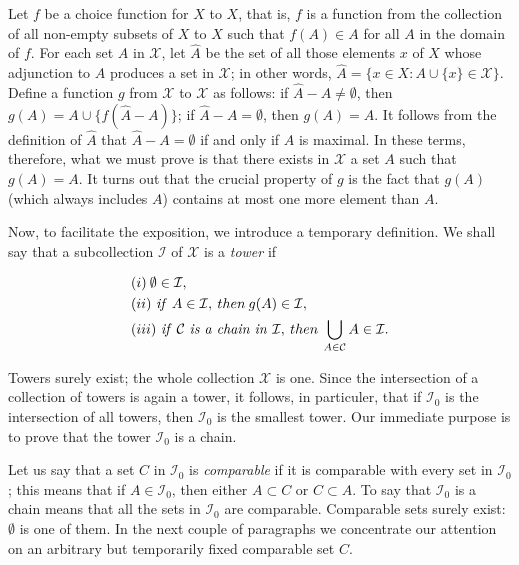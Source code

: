 Let $f$ be a choice function for $X$ to $X$, that is, $f$ is a function from the collection of all non-empty subsets of $X$ to $X$ such that $f(A) \in A$ for all $A$ in the domain of $f$. For each set $A$ in $\mathcal{X}$, let $\hat{A}$ be the set of all those elements $x$ of $X$ whose adjunction to $A$ produces a set in $\mathcal{X}$; in other words, $\hat{A} =\{ x \in X:A \cup \{ x \} \in \mathcal{X} \}$. Define a function $g$ from $\mathcal{X}$ to $\mathcal{X}$ as follows: if $\hat{A} - A \neq \emptyset $, then $g(A) = A \cup \{ f( \hat{A} - A) \}$; if $\hat{A} - A = \emptyset$, then $g(A) = A$. It follows from the definition of $\hat{A}$ that $\hat{A} - A = \emptyset$ if and only if $A$ is maximal. In these terms, therefore, what we must prove is that there exists in $\mathcal{X}$ a set $A$ such that $g(A) = A$. It turns out that the crucial property of $g$ is the fact that $g(A)$ (which always includes $A$) contains at most one more element than $A$.

Now, to facilitate the exposition, we introduce a temporary definition. We shall say that a subcollection $\mathcal{I}$ of $\mathcal{X}$ is a \textit{tower} if 

\begin{align*} 
&(i) \: \emptyset \in \mathcal{I} , \\
&(ii) \text{ \textit{if} } A \in \mathcal{I}, \: then \: g(A) \in \mathcal{I} ,\\
&(iii) \text{ \textit{if} } \mathcal{C} \text{ \textit{is a chain in} } \mathcal{I}, \: then \: \bigcup_{A \in \mathcal{C}} A \in \mathcal{I}. 
\end{align*}

Towers surely exist; the whole collection $\mathcal{X}$ is one. Since the intersection of a collection of towers is again a tower, it follows, in particuler, that if $\mathcal{I}_{0}$ is the intersection of all towers, then $\mathcal{I}_{0}$ is the smallest tower. Our immediate purpose is to prove that the tower $\mathcal{I}_{0}$ is a chain. 

Let us say that a set $C$ in $\mathcal{I}_{0}$ is \textit{comparable} if it is comparable with every set in $\mathcal{I}_{0}$; this means that if $A \in \mathcal{I}_{0}$, then either $A \subset C$ or $C \subset A$. To say that $\mathcal{I}_{0}$ is a chain means that all the sets in $\mathcal{I}_{0}$ are comparable. Comparable sets surely exist: $\emptyset$ is one of them. In the next couple of paragraphs we concentrate our attention on an arbitrary but temporarily fixed comparable set $C$. 

